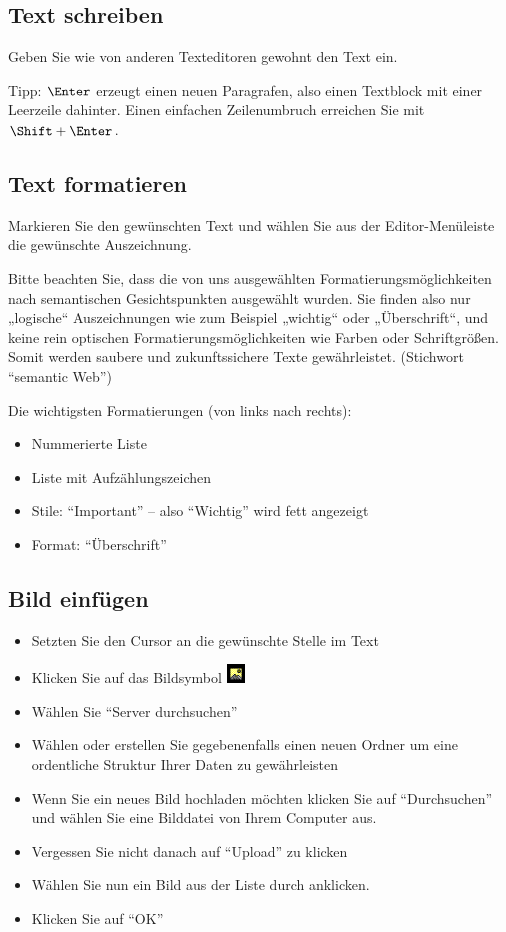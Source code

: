 \documentclass[article, a4paper, oneside, 11pt]{memoir}
\begin{document}
\subsection{Text schreiben}

Geben Sie wie von anderen Texteditoren gewohnt den Text ein.

Tipp: $\Enter$ erzeugt einen neuen Paragrafen, also einen Textblock mit einer Leerzeile dahinter. Einen einfachen Zeilenumbruch erreichen Sie mit $\Shift + \Enter$.

\subsection{Text formatieren}

Markieren Sie den gewünschten Text und wählen Sie aus der Editor-Menüleiste die gewünschte Auszeichnung.

Bitte beachten Sie, dass die von uns ausgewählten
Formatierungsmöglichkeiten nach semantischen Gesichtspunkten ausgewählt
wurden. Sie finden also nur „logische“ Auszeichnungen wie zum Beispiel
„wichtig“ oder „Überschrift“, und keine rein optischen
Formatierungsmöglichkeiten wie Farben oder Schriftgrößen. Somit werden
saubere und zukunftssichere Texte gewährleistet. (Stichwort "`semantic
Web"')

Die wichtigsten Formatierungen (von links nach rechts):

\begin{itemize}
\item Nummerierte Liste
\item Liste mit Aufzählungszeichen
\item Stile: "`Important"' -- also "`Wichtig"' wird fett angezeigt
\item Format: "`Überschrift"'
\end{itemize}


\subsection{Bild einfügen}

\begin{itemize}
\item Setzten Sie den Cursor an die gewünschte Stelle im Text
\item Klicken Sie auf das Bildsymbol \includegraphics[height=5mm]{image_icon}
\item Wählen Sie "`Server durchsuchen"'
\item Wählen oder erstellen Sie gegebenenfalls einen neuen Ordner um eine ordentliche Struktur Ihrer Daten zu gewährleisten
\item Wenn Sie ein neues Bild hochladen möchten klicken Sie auf "`Durchsuchen"' und wählen Sie eine Bilddatei von Ihrem Computer aus.
\item Vergessen Sie nicht danach auf "`Upload"' zu klicken
\item Wählen Sie nun ein Bild aus der Liste durch anklicken.
\item Klicken Sie auf "`OK"'
\end{itemize}
\end{document}
